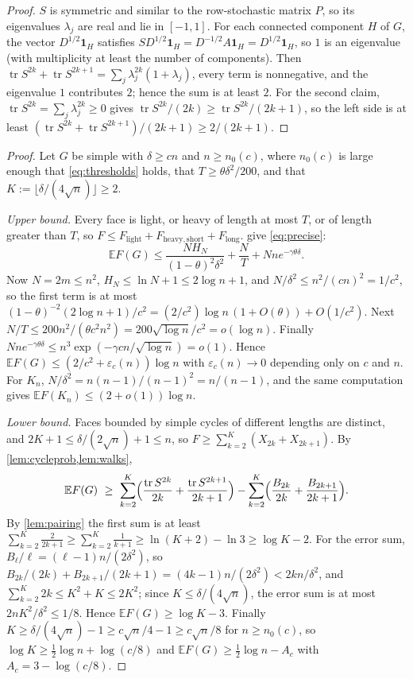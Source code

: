 \documentclass[11pt,a4paper]{article}
\theoremstyle{plain}
\theoremstyle{definition}
\theoremstyle{remark}
\newcommand{\E}{\mathbb E}
\DeclareMathOperator{\tr}{tr}
\newcommand{\ind}{\mathbf 1}
\newcommand{\Flight}{F_{\mathrm{light}}}
\newcommand{\Fheavy}{F_{\mathrm{heavy,short}}}
\newcommand{\Flong}{F_{\mathrm{long}}}
\begin{document}
\label{pf:pairing}
\lempairing*
\begin{proof}
$S$ is symmetric and similar to the row-stochastic matrix $P$, so its eigenvalues $\lambda_j$ are real and lie in $[-1,1]$. For each connected component $H$ of $G$, the vector $D^{1/2}\ind_H$ satisfies $S D^{1/2}\ind_H=D^{-1/2}A\ind_H=D^{1/2}\ind_H$, so $1$ is an eigenvalue (with multiplicity at least the number of components). Then $\tr S^{2k}+\tr S^{2k+1}=\sum_j\lambda_j^{2k}(1+\lambda_j)$, every term is nonnegative, and the eigenvalue $1$ contributes $2$; hence the sum is at least $2$. For the second claim, $\tr S^{2k}=\sum_j\lambda_j^{2k}\ge0$ gives $\tr S^{2k}/(2k)\ge\tr S^{2k}/(2k+1)$, so the left side is at least $(\tr S^{2k}+\tr S^{2k+1})/(2k+1)\ge2/(2k+1)$.
\end{proof}

\label{pf:main}
\thmmain*
\begin{proof}
Let $G$ be simple with $\delta\ge cn$ and $n\ge n_0(c)$, where $n_0(c)$ is large enough that \eqref{eq:thresholds} holds, that $T\ge\theta\delta^2/200$, and that $K:=\lfloor\delta/(4\sqrt n)\rfloor\ge2$.

\emph{Upper bound.} Every face is light, or heavy of length at most $T$, or of length greater than $T$, so $F\le\Flight+\Fheavy+\Flong$.  give \eqref{eq:precise}:
\[
 \E F(G)\le\frac{NH_N}{(1-\theta)^2\delta^2}+\frac NT+Nne^{-\gamma\theta\delta}.
\]
Now $N=2m\le n^2$, $H_N\le\ln N+1\le2\log n+1$, and $N/\delta^2\le n^2/(cn)^2=1/c^2$, so the first term is at most $(1-\theta)^{-2}(2\log n+1)/c^2=(2/c^2)\log n\,(1+O(\theta))+O(1/c^2)$. Next $N/T\le200n^2/(\theta c^2n^2)=200\sqrt{\log n}/c^2=o(\log n)$. Finally $Nne^{-\gamma\theta\delta}\le n^3\exp(-\gamma cn/\sqrt{\log n})=o(1)$. Hence $\E F(G)\le(2/c^2+\varepsilon_c(n))\log n$ with $\varepsilon_c(n)\to0$ depending only on $c$ and $n$. For $K_n$, $N/\delta^2=n(n-1)/(n-1)^2=n/(n-1)$, and the same computation gives $\E F(K_n)\le(2+o(1))\log n$.

\emph{Lower bound.} Faces bounded by simple cycles of different lengths are distinct, and $2K+1\le\delta/(2\sqrt n)+1\le n$, so $F\ge\sum_{k=2}^K(X_{2k}+X_{2k+1})$. By \cref{lem:cycleprob,lem:walks},
\[
 \E F(G)\ \ge\ \sum_{k=2}^K\Bigl(\frac{\tr S^{2k}}{2k}+\frac{\tr S^{2k+1}}{2k+1}\Bigr)-\sum_{k=2}^K\Bigl(\frac{B_{2k}}{2k}+\frac{B_{2k+1}}{2k+1}\Bigr).
\]
By \cref{lem:pairing} the first sum is at least $\sum_{k=2}^K\frac2{2k+1}\ge\sum_{k=2}^K\frac1{k+1}\ge\ln(K+2)-\ln 3\ge\log K-2$. For the error sum, $B_\ell/\ell=(\ell-1)n/(2\delta^2)$, so $B_{2k}/(2k)+B_{2k+1}/(2k+1)=(4k-1)n/(2\delta^2)<2kn/\delta^2$, and $\sum_{k=2}^K2k\le K^2+K\le2K^2$; since $K\le\delta/(4\sqrt n)$, the error sum is at most $2nK^2/\delta^2\le1/8$. Hence $\E F(G)\ge\log K-3$. Finally $K\ge\delta/(4\sqrt n)-1\ge c\sqrt n/4-1\ge c\sqrt n/8$ for $n\ge n_0(c)$, so $\log K\ge\tfrac12\log n+\log(c/8)$ and $\E F(G)\ge\tfrac12\log n-A_c$ with $A_c=3-\log(c/8)$.
\end{proof}
\end{document}
